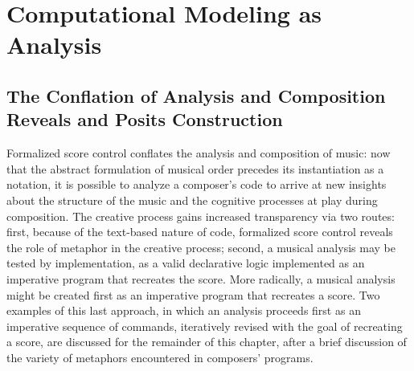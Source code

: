\chapter{Computational Modeling as Analysis}
\section{The Conflation of Analysis and Composition Reveals and Posits Construction}

Formalized score control conflates the analysis and composition of music: now that the abstract formulation of musical order precedes its instantiation as a notation, it is possible to analyze a composer's code to arrive at new insights about the structure of the music and the cognitive processes at play during composition. The creative process gains increased transparency via two routes: first, because of the text-based nature of code, formalized score control reveals the role of metaphor in the creative process; second, a musical analysis may be tested by implementation, as a valid declarative logic implemented as an imperative program that recreates the score. More radically, a musical analysis might be created first as an imperative program that recreates a score. Two examples of this last approach, in which an analysis proceeds first as an imperative sequence of commands, iteratively revised with the goal of recreating a score, are discussed for the remainder of this chapter, after a brief discussion of the variety of metaphors encountered in composers' programs.

